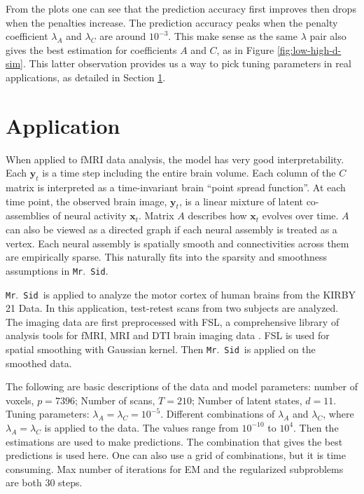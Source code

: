 \documentclass[fleqn,12pt]{article}
\let\oldref\ref
\renewcommand{\ref}[1]{(\oldref{#1})}
\newcommand{\mrsid}{{\sc \texttt{Mr}.~\texttt{Sid}}}
\providecommand{\mb}[1]{\boldsymbol{#1}}
\newcommand{\bx}{\mb{x}}
\newcommand{\by}{\mb{y}}
\begin{document}
From the plots one can see that the prediction accuracy first improves then drops when the penalties increase. The prediction accuracy peaks when the penalty coefficient $\lambda_A$ and $\lambda_C$ are around $10^{-3}$. This make sense as the same $\lambda$ pair also gives the best estimation for coefficients $A$ and $C$, as in Figure \oldref{fig:low-high-d-sim}. This latter observation provides us a way to pick tuning parameters in real applications, as detailed in Section \oldref{sec:application}.

\section{Application}
\label{sec:application}
When applied to fMRI data analysis, the model has very good interpretability. Each $\by_t$ is a time step including the entire brain volume. Each column of the $C$ matrix is interpreted as a time-invariant brain ``point spread function''. At each time point, the observed brain image, $\by_t$, is a linear mixture of latent co-assemblies of neural activity  $\bx_t$. Matrix $A$ describes how $\bx_t$ evolves over time. $A$ can also be viewed as a directed graph if each neural assembly is treated as a vertex. Each neural assembly is spatially smooth and connectivities across them are empirically sparse. This naturally fits into the sparsity and smoothness assumptions in \mrsid.

\mrsid~is applied to analyze the motor cortex of human brains from the KIRBY 21 Data. In this application, test-retest scans from two subjects are analyzed. The imaging data are first preprocessed with FSL, a comprehensive library of analysis tools for fMRI, MRI and DTI brain imaging data \citep{smith2004advances}. FSL is used for spatial smoothing with Gaussian kernel. Then \mrsid~is applied on the smoothed data.

The following are basic descriptions of the data and model parameters: number of voxels, $p = 7396$; Number of scans, $T = 210$; Number of latent states, $d = 11$. Tuning parameters: $\lambda_A = \lambda_C = 10^{-5}$. Different combinations of $\lambda_A$ and $\lambda_C$, where $\lambda_A = \lambda_C$ is applied to the data. The values range from $10^{-10}$ to $10^{4}$. Then the estimations are used to make predictions. The combination that gives the best predictions is used here. One can also use a grid of combinations, but it is time consuming. Max number of iterations for EM and the regularized subproblems are both 30 steps.
\end{document}
